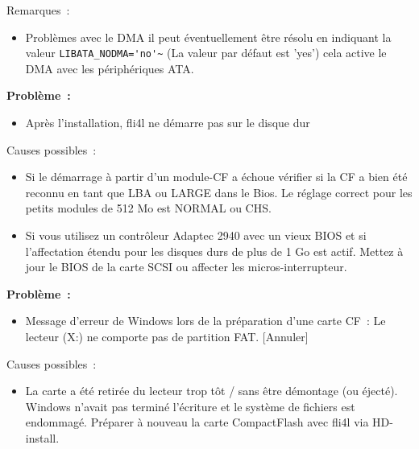     Remarques~:
    \begin{itemize}
    \item Problèmes avec le DMA il peut éventuellement être résolu en indiquant
    la valeur \verb*?LIBATA_NODMA='no'~? (La valeur par défaut est 'yes')
    cela active le DMA avec les périphériques ATA.
    \end{itemize}

    \textbf{Problème~:}
    \begin{itemize}
    \item Après l'installation, fli4l ne démarre pas sur le disque dur
    \end{itemize}

    Causes possibles~:
    \begin{itemize}
    \item Si le démarrage à partir d'un module-CF a échoue vérifier si la CF
    a bien été reconnu en tant que LBA ou LARGE dans le Bios. Le réglage
    correct pour les petits modules de 512 Mo est NORMAL ou CHS.
    \item Si vous utilisez un contrôleur Adaptec 2940 avec un vieux BIOS et
    si l'affectation étendu pour les disques durs de plus de 1 Go est actif.
    Mettez à jour le BIOS de la carte SCSI ou affecter les micros-interrupteur.\\
    \end{itemize}

    \textbf{Problème~:}
    \begin{itemize}
    \item Message d'erreur de Windows lors de la préparation d'une carte CF~:
    \flqq{}Le lecteur (X:) ne comporte pas de partition FAT. [Annuler]\frqq{}
    \end{itemize}

    Causes possibles~:
    \begin{itemize}
    \item La carte a été retirée du lecteur trop tôt / sans être démontage
    (ou éjecté). Windows n'avait pas terminé l'écriture et le système de
    fichiers est endommagé. Préparer à nouveau la carte CompactFlash avec
    fli4l via HD-install.
    \end{itemize}